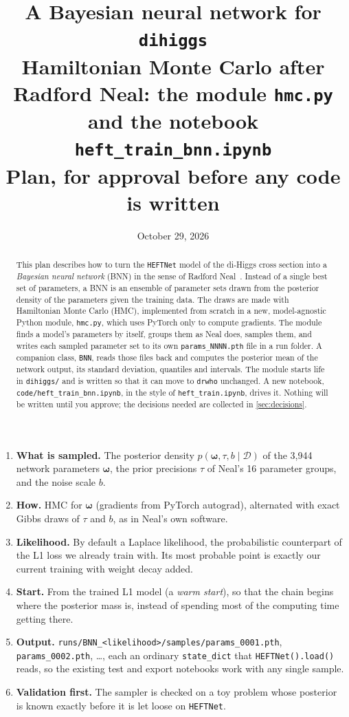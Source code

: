\documentclass[11pt]{article}
\title{\textbf{A Bayesian neural network for \texttt{dihiggs}}\\[4pt]
\large Hamiltonian Monte Carlo after Radford Neal: the module \texttt{hmc.py}\\
\large and the notebook \texttt{heft\_train\_bnn.ipynb}\\[4pt]
\normalsize Plan, for approval before any code is written}
\date{October 29, 2026}
\newcommand{\file}[1]{\nolinkurl{#1}}
\newcommand{\code}[1]{\texttt{#1}}
\newcommand{\bw}{\boldsymbol{\omega}}
\newcommand{\data}{\mathcal{D}}
\begin{document}
\maketitle

\begin{abstract}
\noindent
This plan describes how to turn the \code{HEFTNet} model of the di-Higgs cross
section into a \emph{Bayesian neural network} (BNN) in the sense of Radford
Neal~\cite{neal1996,neal2011}. Instead of a single best set of parameters, a BNN is
an ensemble of parameter sets drawn from the posterior density of the parameters
given the training data. The draws are made with Hamiltonian Monte Carlo (HMC),
implemented from scratch in a new, model-agnostic Python module, \file{hmc.py}, which
uses PyTorch only to compute gradients. The module finds a model's parameters by
itself, groups them as Neal does, samples them, and writes each sampled parameter set
to its own \file{params_NNNN.pth} file in a run folder. A companion class, \code{BNN},
reads those files back and computes the posterior mean of the network output, its
standard deviation, quantiles and intervals. The module starts life in
\file{dihiggs/} and is written so that it can move to \code{drwho} unchanged. A new
notebook, \file{code/heft_train_bnn.ipynb}, in the style of \file{heft_train.ipynb},
drives it. Nothing will be written until you approve; the decisions needed are
collected in \cref{sec:decisions}.
\end{abstract}

\begin{keyidea}
\begin{enumerate}
  \item \textbf{What is sampled.} The posterior density
    $p(\bw, \tau, b \mid \data)$ of the 3,944 network parameters $\bw$, the
    prior precisions $\tau$ of Neal's 16 parameter groups, and the noise scale $b$.
  \item \textbf{How.} HMC for $\bw$ (gradients from PyTorch autograd), alternated
    with exact Gibbs draws of $\tau$ and $b$, as in Neal's own software.
  \item \textbf{Likelihood.} By default a Laplace likelihood, the probabilistic
    counterpart of the L1 loss we already train with. Its most probable point is
    exactly our current training with weight decay added.
  \item \textbf{Start.} From the trained L1 model (a \emph{warm start}), so that the
    chain begins where the posterior mass is, instead of spending most of the
    computing time getting there.
  \item \textbf{Output.} \file{runs/BNN_<likelihood>/samples/params_0001.pth},
    \file{params_0002.pth}, \ldots, each an ordinary \code{state\_dict} that
    \code{HEFTNet().load()} reads, so the existing test and export notebooks
    work with any single sample.
  \item \textbf{Validation first.} The sampler is checked on a toy problem whose
    posterior is known exactly before it is let loose on \code{HEFTNet}.
\end{enumerate}
\end{keyidea}
\end{document}
